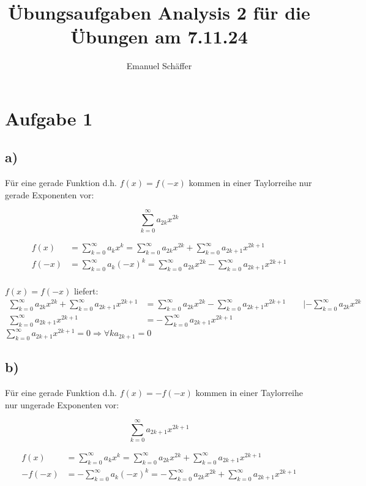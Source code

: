 \documentclass[a4paper, ngerman]{scrartcl}
\begin{document}
	\title{Übungsaufgaben Analysis 2 für die Übungen am 7.11.24}
	\author{Emanuel Schäffer}
	\maketitle
	
	\section*{Aufgabe 1}
	\subsection*{a)}
	Für eine gerade Funktion d.h. $f(x) = f(-x)$ kommen in einer Taylorreihe nur gerade Exponenten vor:
	
	$$\sum_{k=0}^{\infty} a_{2k}x^{2k}$$
	
	\begin{align*}
		f(x) &= \sum_{k=0}^{\infty} a_kx^k = \sum_{k=0}^{\infty} a_{2k}x^{2k} + \sum_{k=0}^{\infty} a_{2k + 1}x^{2k + 1}\\
		f(-x) &= \sum_{k=0}^{\infty} a_k(-x)^k = \sum_{k=0}^{\infty} a_{2k}x^{2k} - \sum_{k=0}^{\infty} a_{2k + 1}x^{2k + 1}\\
	\end{align*}
	
	$f(x) = f(-x)$ liefert:
	\begin{align*}
		\sum_{k=0}^{\infty} a_{2k}x^{2k} + \sum_{k=0}^{\infty} a_{2k + 1}x^{2k + 1} &= \sum_{k=0}^{\infty} a_{2k}x^{2k} - \sum_{k=0}^{\infty} a_{2k + 1}x^{2k + 1} \qquad |-\sum_{k=0}^{\infty} a_{2k}x^{2k} \\
		\sum_{k=0}^{\infty} a_{2k + 1}x^{2k + 1} &= - \sum_{k=0}^{\infty} a_{2k + 1}x^{2k + 1}
	\end{align*}
	$\displaystyle{\sum_{k=0}^{\infty} a_{2k + 1}x^{2k + 1} = 0} \Rightarrow \forall k a_{2k + 1} = 0$ 
	
	\newpage
	\subsection*{b)}
	Für eine gerade Funktion d.h. $f(x) = -f(-x)$ kommen in einer Taylorreihe nur ungerade Exponenten vor:
	
	$$\sum_{k=0}^{\infty} a_{2k+1}x^{2k+1}$$
	
	
	\begin{align*}
		f(x) &= \sum_{k=0}^{\infty} a_kx^k = \sum_{k=0}^{\infty} a_{2k}x^{2k} + \sum_{k=0}^{\infty} a_{2k + 1}x^{2k + 1}\\
		-f(-x) &= -\sum_{k=0}^{\infty} a_k(-x)^k = -\sum_{k=0}^{\infty} a_{2k}x^{2k} + \sum_{k=0}^{\infty} a_{2k + 1}x^{2k + 1}\\
	\end{align*}
	
\end{document}
